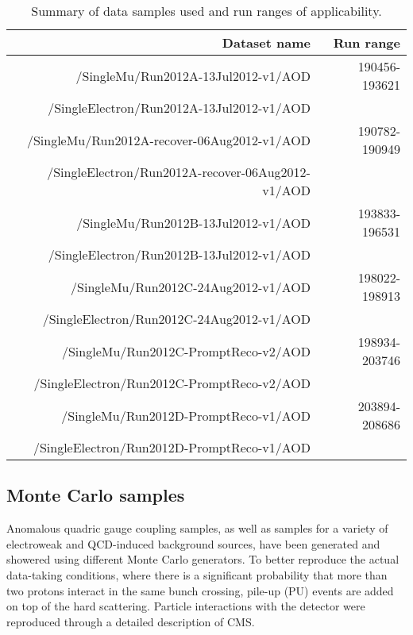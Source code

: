 \begin{table}[]
  \begin{center}
  \begin{tabular}{r|r}
  \hline
  Dataset name & Run range \\
  \hline
  /SingleMu/Run2012A-13Jul2012-v1/AOD         & 190456-193621  \\
  /SingleElectron/Run2012A-13Jul2012-v1/AOD   &            \\
  \hline
  /SingleMu/Run2012A-recover-06Aug2012-v1/AOD        &  190782-190949  \\
  /SingleElectron/Run2012A-recover-06Aug2012-v1/AOD  &     \\
  \hline
  /SingleMu/Run2012B-13Jul2012-v1/AOD         &  193833-196531  \\
  /SingleElectron/Run2012B-13Jul2012-v1/AOD   &         \\
  \hline
  /SingleMu/Run2012C-24Aug2012-v1/AOD       & 198022-198913 \\
  /SingleElectron/Run2012C-24Aug2012-v1/AOD & \\
  \hline
  /SingleMu/Run2012C-PromptReco-v2/AOD       & 198934-203746 \\
  /SingleElectron/Run2012C-PromptReco-v2/AOD & \\
  \hline
  /SingleMu/Run2012D-PromptReco-v1/AOD       & 203894-208686 \\
  /SingleElectron/Run2012D-PromptReco-v1/AOD & \\
  \hline
  \hline
  \end{tabular}
  \end{center}
  \caption{Summary of data samples used and run ranges of applicability.}
  \label{tab:datasets}
\end{table}%

\subsection{Monte Carlo samples}

Anomalous quadric gauge coupling samples, as well as samples for a
variety of electroweak and QCD-induced background sources, have been 
generated and showered using different Monte Carlo generators. To better 
reproduce the actual data-taking conditions, where there is a significant 
probability that more than two protons interact in the same bunch crossing,
pile-up (PU) events are added on top of the hard scattering. Particle 
interactions with the detector were reproduced through a detailed 
description of CMS.

